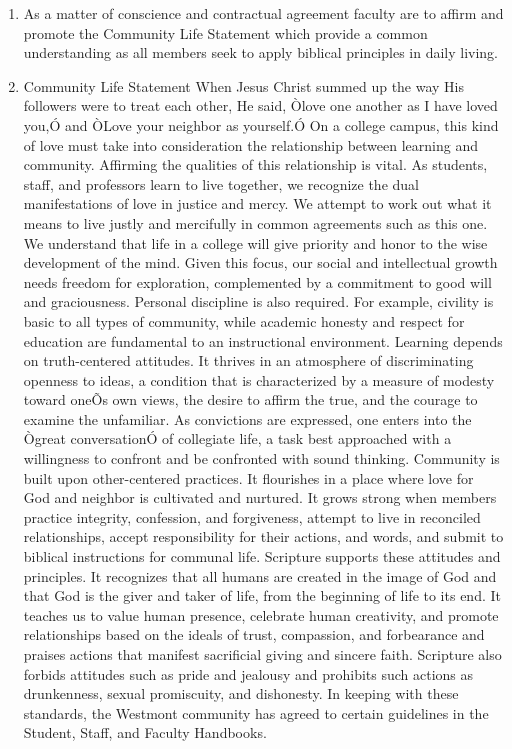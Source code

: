 \documentclass[letterpaper, 11pt]{article}
\begin{document}
				\begin{enumerate}[label=\alph*)]
					\item{As a matter of conscience and contractual agreement faculty are to affirm and promote the Community Life Statement which provide a common understanding as all members seek to apply biblical principles in daily living.}
					\item{Community Life Statement}
					When Jesus Christ summed up the way His followers were to treat each other, He said, Òlove one another as I have loved you,Ó and ÒLove your neighbor as yourself.Ó  On a college campus, this kind of love must take into consideration the relationship between learning and community.
					Affirming the qualities of this relationship is vital.  As students, staff, and professors learn to live together, we recognize the dual manifestations of love in justice and mercy.  We attempt to work out what it means to live justly and mercifully in common agreements such as this one.  We understand that life in a college will give priority and honor to the wise development of the mind.
					Given this focus, our social and intellectual growth needs freedom for exploration, complemented by a commitment to good will and graciousness.  Personal discipline is also required.  For example, civility is basic to all types of community, while academic honesty and respect for education are fundamental to an instructional environment.
					Learning depends on truth-centered attitudes.  It thrives in an atmosphere of discriminating openness to ideas, a condition that is characterized by a measure of modesty toward oneÕs own views, the desire to affirm the true, and the courage to examine the unfamiliar.  As convictions are expressed, one enters into the Ògreat conversationÓ of collegiate life, a task best approached with a willingness to confront and be confronted with sound thinking.
					Community is built upon other-centered practices.  It flourishes in a place where love for God and neighbor is cultivated and nurtured.  It grows strong when members practice integrity, confession, and forgiveness, attempt to live in reconciled relationships, accept responsibility for their actions, and words, and submit to biblical instructions for communal life.
					Scripture supports these attitudes and principles.  It recognizes that all humans are created in the image of God and that God is the giver and taker of life, from the beginning of life to its end.  It teaches us to value human presence, celebrate human creativity, and promote relationships based on the ideals of trust, compassion, and forbearance and praises actions that manifest sacrificial giving and sincere faith.  Scripture also forbids attitudes such as pride and jealousy and prohibits such actions as drunkenness, sexual promiscuity, and dishonesty.  In keeping with these standards, the Westmont community has agreed to certain guidelines in the Student, Staff, and Faculty Handbooks.

\end{enumerate}
\end{document}
